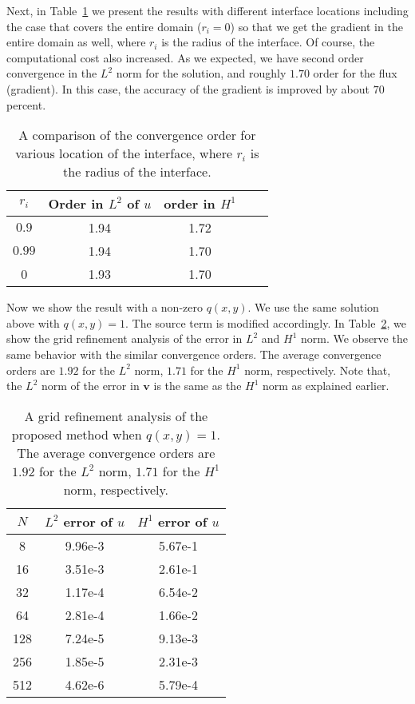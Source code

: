 \documentclass[11pt]{article}
\numberwithin{equation}{section}
\begin{document}
Next, in Table~\ref{table43 ch2} we present the results with different interface locations
including the case that covers the entire domain ($r_i=0$)
so that we get the gradient in the entire domain as well,
where $r_i$ is the radius of the interface.
Of course, the computational cost also increased.
As we expected, we have second order convergence in the $L^2$ norm for the solution,
and roughly $1.70$ order for the flux (gradient).
In this case, the accuracy of the gradient  is improved by about $70$ percent.

\begin{table}[H]
\centering
\begin{tabular}{|c|c|c|c|c|}
\hline
$r_i$ &Order in $L^2$ of $u$  & order in $H^1$  \\
\hline
 $0.9$  & 1.94 & 1.72\\
\hline
 $0.99$  & 1.94 & 1.70\\
\hline
 0  & 1.93 & 1.70\\
\hline
\end{tabular}
\caption{A comparison of the convergence order for various location of the interface, where $r_i$ is the radius of the interface.\label{table43 ch2}}
\end{table}

Now we show the result with a non-zero $q(x,y)$.
We use the same solution above with $q(x,y)=1$.
The source term is modified accordingly.
In Table~\ref{table41_new_q},
we show the grid refinement analysis of the error in $L^2$ and $H^1$ norm.
We observe the same behavior with the similar convergence orders.
The average convergence orders are $1.92$ for the $L^2$ norm, $1.71$ for the $H^1$ norm, respectively.
Note that, the $L^2$ norm of the error in $\mathbf{v}$ is the same as the $H^1$ norm as explained earlier.

\begin{table}[H]
\centering
\begin{tabular}{|c|c|c|}
\hline
 $N$  & $L^2$ error of ${u}$ & $H^1$ error of ${u}$ \\
\hline
8 & 9.96e-3 & 5.67e-1  \\
\hline
16 & 3.51e-3 & 2.61e-1  \\
\hline
32 & 1.17e-4 & 6.54e-2  \\
\hline
64 & 2.81e-4 & 1.66e-2  \\
\hline
128 & 7.24e-5 & 9.13e-3  \\
\hline
256 & 1.85e-5 &2.31e-3  \\
\hline
512 & 4.62e-6 &5.79e-4  \\
\hline
\end{tabular}
\caption{A grid refinement analysis of the proposed method when $q(x,y)=1$. The average convergence orders are $1.92$ for the $L^2$ norm, $1.71$ for the $H^1$ norm, respectively.} \label{table41_new_q}
\end{table}
\end{document}
